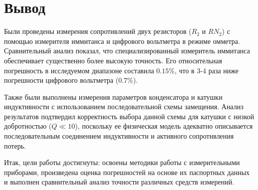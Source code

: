 \section{Вывод}

Были проведены измерения сопротивлений двух резисторов ($R_2$ и $RN_{2}$) с помощью измерителя иммитанса и цифрового вольтметра в режиме омметра. Сравнительный анализ показал, что специализированный измеритель иммитанса обеспечивает существенно более высокую точность. Его относительная погрешность в исследуемом диапазоне составила $0.15\%$, что в 3-4 раза ниже погрешности цифрового вольтметра ($0.7\%$).

Также были выполнены измерения параметров конденсатора и катушки индуктивности с использованием последовательной схемы замещения. Анализ результатов подтвердил корректность выбора данной схемы для катушки с низкой добротностью ($Q \ll 10$), поскольку ее физическая модель адекватно описывается последовательным соединением индуктивности и активного сопротивления потерь.

Итак, цели работы достигнуты: освоены методики работы с измерительными приборами, произведена оценка погрешностей на основе их паспортных данных и выполнен сравнительный анализ точности различных средств измерений.